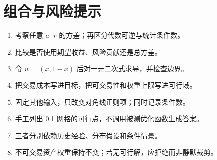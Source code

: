\chapter{组合与风险提示}
\begin{enumerate}[leftmargin=*]
  \item 考察任意 $a^\top r$ 的方差；再区分代数可逆与统计条件数。
  \item 比较是否使用期望收益、风险贡献还是总方差。
  \item 令 $w=(x,1-x)$ 后对一元二次式求导，并检查边界。
  \item 把交易成本写进目标，把可交易性和权重上限写进可行域。
  \item 固定其他输入，只改变对角线正则项；同时记录条件数。
  \item 手工列出 0.1 网格的可行点，不调用被测优化函数生成答案。
  \item 三者分别依赖历史经验、分布假设和条件情景。
  \item 不可交易资产权重保持不变；若无可行解，应拒绝而非静默裁剪。
\end{enumerate}
